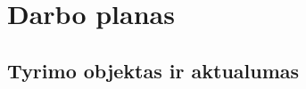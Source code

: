\documentclass[]{VUMIFTemplateClass}
\begin{document}

\onehalfspacing


\section{Darbo planas}

\subsection{Tyrimo objektas ir aktualumas}




\end{document}
